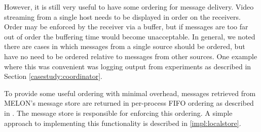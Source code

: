 However, it is still very useful to have some ordering for message delivery. Video streaming from a single host needs to be displayed in order on the receivers. Order may be enforced by the receiver via a buffer, but if messages are too far out of order the buffering time would become unacceptable. In general, we noted there are cases in which messages from a single source should be ordered, but have no need to be ordered relative to messages from other sources. One example where this was convenient was logging output from experiments as described in Section \ref{casestudy:coordinator}.

To provide some useful ordering with minimal overhead, messages retrieved from MELON's message store are returned in per-process FIFO ordering as described in \cite{distbook}. The message store is responsible for enforcing this ordering. A simple approach to implementing this functionality is described in \ref{impl:localstore}.